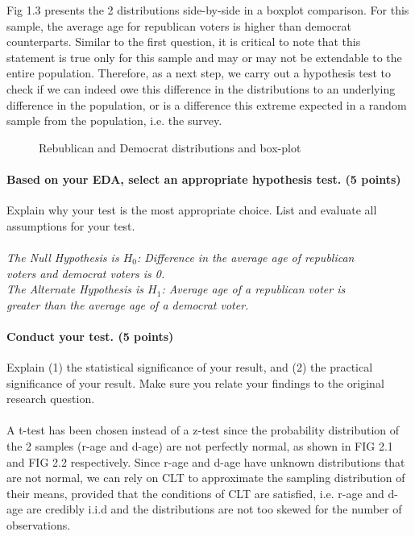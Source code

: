 \documentclass[12pt]{article}
\begin{document}
Fig 1.3 presents the 2 distributions side-by-side in a boxplot comparison. For this sample, the average age for republican voters is higher than democrat counterparts. Similar to the first question, it is critical to note that this statement is true only for this sample and may or may not be extendable to the entire population. Therefore, as a next step, we carry out a hypothesis test to check if we can indeed owe this difference in the distributions to an underlying difference in the population, or is a difference this extreme expected in a random sample from the population, i.e. the survey.

\begin{figure}[H]
\centering
\scalebox{.70}{
}
\caption{Rebublican and Democrat distributions and box-plot}
\end{figure}

\paragraph{Based on your EDA, select an appropriate hypothesis test. (5 points)}
Explain why your test is the most appropriate choice. List and evaluate all assumptions for your test.

\paragraph{}
\parbox{\textwidth}{\emph{The Null Hypothesis is $H_0$: Difference in the average age of republican \\ voters and  democrat voters is 0.\\ The Alternate Hypothesis is $H_1$: Average age of a republican voter is \\ greater than the average age of a democrat voter.}}

\paragraph{Conduct your test. (5 points)}
Explain (1) the statistical significance of your result, and (2) the practical significance of your result. Make sure you relate your findings to the original research question.

\paragraph{}
A t-test has been chosen instead of a z-test since the probability distribution of the 2 samples (r-age and d-age) are not perfectly normal, as shown in FIG 2.1 and FIG 2.2 respectively. Since r-age and d-age have unknown distributions that are not normal, we can rely on CLT to approximate the sampling distribution of their means, provided that the conditions of CLT are satisfied, i.e. r-age and d-age are credibly i.i.d and the distributions are not too skewed for the number of observations.
\end{document}
